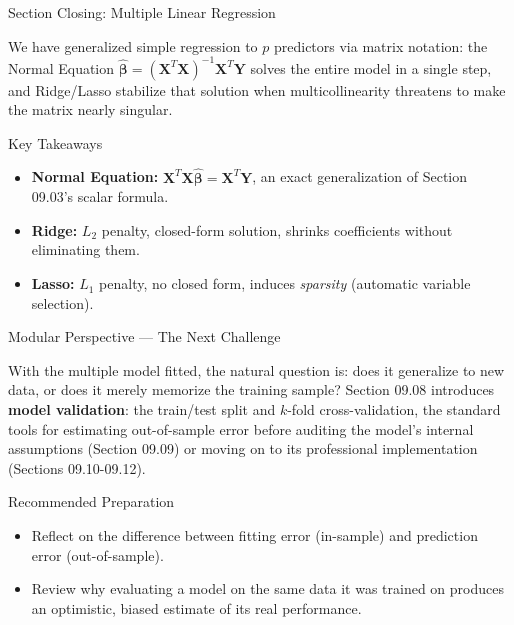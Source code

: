 \documentclass[10pt, aspectratio=169]{beamer}
\begin{document}
\begin{frame}{Section Closing: Multiple Linear Regression}
  \begin{reflexion}
    We have generalized simple regression to $p$ predictors via matrix notation: the Normal Equation $\hat{\boldsymbol\beta}=(\mathbf{X}^T\mathbf{X})^{-1}\mathbf{X}^T\mathbf{Y}$ solves the entire model in a single step, and Ridge/Lasso stabilize that solution when multicollinearity threatens to make the matrix nearly singular.
  \end{reflexion}

  \vspace{0.2cm}
  \pause
  \begin{block}{Key Takeaways}
    \begin{itemize}\itemsep=0.08cm
      \item \textbf{Normal Equation:} $\mathbf{X}^T\mathbf{X}\hat{\boldsymbol\beta}=\mathbf{X}^T\mathbf{Y}$, an exact generalization of Section 09.03's scalar formula.
      \item \textbf{Ridge:} $L_2$ penalty, closed-form solution, shrinks coefficients without eliminating them.
      \item \textbf{Lasso:} $L_1$ penalty, no closed form, induces \emph{sparsity} (automatic variable selection).
    \end{itemize}
  \end{block}
\end{frame}

\begin{frame}{Modular Perspective --- The Next Challenge}
  \scriptsize
  \begin{retoclase}
    With the multiple model fitted, the natural question is: does it generalize to new data, or does it merely memorize the training sample? Section 09.08 introduces \textbf{model validation}: the train/test split and $k$-fold cross-validation, the standard tools for estimating out-of-sample error before auditing the model's internal assumptions (Section 09.09) or moving on to its professional implementation (Sections 09.10-09.12).
  \end{retoclase}

  \vspace{0.08cm}
  \pause
  \begin{alertblock}{Recommended Preparation}
    \begin{itemize}\itemsep=0.06cm
      \item Reflect on the difference between fitting error (in-sample) and prediction error (out-of-sample).
      \item Review why evaluating a model on the same data it was trained on produces an optimistic, biased estimate of its real performance.
    \end{itemize}
  \end{alertblock}
\end{frame}
\end{document}

